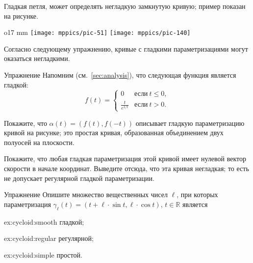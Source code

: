 Гладкая петля, может определять негладкую замкнутую кривую;
пример показан на рисунке.

\begin{wrapfigure}{o}{17 mm}
\vskip-4mm
\centering
\texttt{[image: mppics/pic-51]}
\bigskip
\texttt{[image: mppics/pic-140]}
\vskip-8mm
\end{wrapfigure}

Согласно следующему упражнению, кривые с гладкими параметризациями могут оказаться негладкими.

\begin{thm}{Упражнение}\label{ex:L-shape}
Напомним (см.~\ref{sec:analysis}), что следующая функция является гладкой: 
\[f(t)=
\begin{cases}
0&\text{если}\ t\le 0,
\\
\frac{t}{e^{1\!/\!t}}&\text{если}\ t> 0.
\end{cases}
\]

Покажите, что $\alpha(t)=(f(t),f(-t))$ описывает гладкую параметризацию кривой на рисунке;
это простая кривая, образованная объединением двух полуосей на плоскости.

{\sloppy

Покажите, что любая гладкая параметризация этой кривой имеет нулевой вектор скорости в начале координат.
Выведите отсюда, что эта кривая негладкая;
то есть не допускает регулярной гладкой параметризации.

}

\end{thm}

\begin{thm}{Упражнение}\label{ex:cycloid}
Опишите множество вещественных чисел $\ell$, 
при которых параметризация $\gamma_\ell (t)= (t+\ell \cdot \sin t,\ell \cdot \cos t)$, $t\in\mathbb{R}$ является

\begin{minipage}{.30\textwidth}
\begin{subthm}{ex:cycloid:smooth}
гладкой; 
\end{subthm}
\end{minipage}
\hfill
\begin{minipage}{.30\textwidth}
\begin{subthm}{ex:cycloid:regular}
регулярной;
\end{subthm}
\end{minipage}
\hfill
\begin{minipage}{.30\textwidth}
\begin{subthm}{ex:cycloid:simple}
простой.
\end{subthm}
\end{minipage}

\end{thm}

